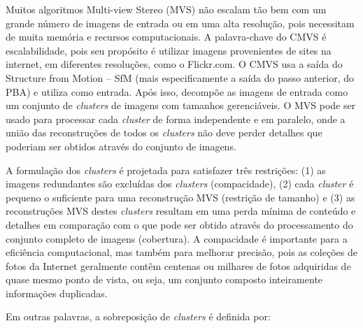 %
Muitos algoritmos Multi-view Stereo (MVS) não escalam tão bem com um grande número de imagens de entrada ou em uma alta resolução, pois necessitam de muita memória e recursos computacionais. A palavra-chave do CMVS é escalabilidade, pois seu propósito é utilizar imagens provenientes de sites na internet, em diferentes resoluções, como o Flickr.com.  
O CMVS usa a saída do Structure from Motion -- SfM (mais especificamente a saída do passo anterior, do PBA) e utiliza como entrada. Após isso, decompõe as imagens de entrada como um conjunto de {\it clusters} de imagens com tamanhos gerenciáveis. O MVS pode ser usado para processar cada {\it cluster} de forma independente e em paralelo, onde a união das reconstruções de todos os {\it clusters} não deve perder detalhes que poderiam ser obtidos através do conjunto de imagens.

A formulação dos {\it clusters} é projetada para satisfazer três restrições: (1) as imagens redundantes são excluídas dos {\it clusters} (compacidade), (2) cada {\it cluster} é pequeno o suficiente para uma reconstrução MVS (restrição de tamanho) e (3) as reconstruções MVS destes {\it clusters} resultam em uma perda mínima de conteúdo e detalhes em comparação com o que pode ser obtido através do processamento do conjunto completo de imagens (cobertura).
A compacidade é importante para a eficiência computacional, mas também para melhorar precisão, pois as coleções de fotos da Internet geralmente contêm centenas ou milhares de fotos adquiridas de quase mesmo ponto de vista, ou seja, um conjunto composto inteiramente informações duplicadas.

Em outras palavras, a sobreposição de {\it clusters} é definida por:

